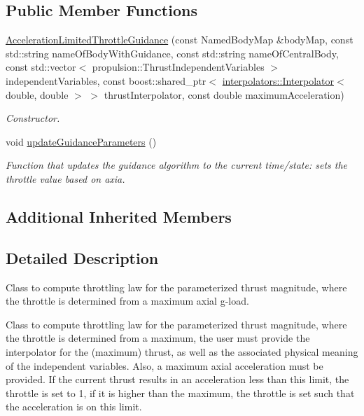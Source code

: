 \subsection*{Public Member Functions}
\begin{DoxyCompactItemize}
\item 
\hyperlink{classtudat_1_1simulation__setup_1_1AccelerationLimitedThrottleGuidance_a53043f861a55d8052874f269ae975716}{Acceleration\+Limited\+Throttle\+Guidance} (const Named\+Body\+Map \&body\+Map, const std\+::string name\+Of\+Body\+With\+Guidance, const std\+::string name\+Of\+Central\+Body, const std\+::vector$<$ propulsion\+::\+Thrust\+Independent\+Variables $>$ independent\+Variables, const boost\+::shared\+\_\+ptr$<$ \hyperlink{classtudat_1_1interpolators_1_1Interpolator}{interpolators\+::\+Interpolator}$<$ double, double $>$ $>$ thrust\+Interpolator, const double maximum\+Acceleration)
\begin{DoxyCompactList}\small\item\em Constructor. \end{DoxyCompactList}\item 
void \hyperlink{classtudat_1_1simulation__setup_1_1AccelerationLimitedThrottleGuidance_a5b08d0dc0c2c16de63f7391fdff697d4}{update\+Guidance\+Parameters} ()
\begin{DoxyCompactList}\small\item\em Function that updates the guidance algorithm to the current time/state\+: sets the throttle value based on axia. \end{DoxyCompactList}\end{DoxyCompactItemize}
\subsection*{Additional Inherited Members}


\subsection{Detailed Description}
Class to compute throttling law for the parameterized thrust magnitude, where the throttle is determined from a maximum axial g-\/load.

Class to compute throttling law for the parameterized thrust magnitude, where the throttle is determined from a maximum, the user must provide the interpolator for the (maximum) thrust, as well as the associated physical meaning of the independent variables. Also, a maximum axial acceleration must be provided. If the current thrust results in an acceleration less than this limit, the throttle is set to 1, if it is higher than the maximum, the throttle is set such that the acceleration is on this limit. 

